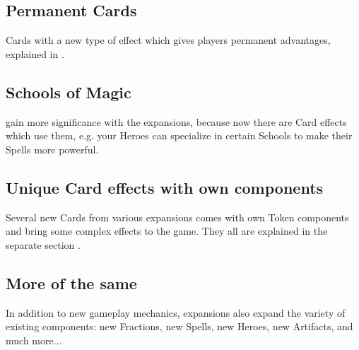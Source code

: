 \begin{multicols*}{2}
\subsection*{Permanent Cards}
Cards with a new type of effect which gives players permanent advantages, explained in .

\subsection*{Schools of Magic}
 gain more significance with the expansions, because now there are Card effects which use them, e.g. your Heroes can specialize in certain Schools to make their Spells more powerful.

\subsection*{Unique Card effects with own components}
Several new Cards from various expansions comes with own Token components and bring some complex effects to the game.
They all are explained in the separate section .

\subsection*{More of the same}
In addition to new gameplay mechanics, expansions also expand the variety of existing components: new Fractions, new Spells, new Heroes, new Artifacts, and much more...

\begin{center}
\end{center}
\end{multicols*}
\pagebreak

